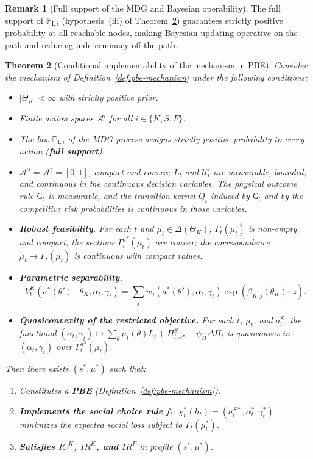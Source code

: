 \documentclass[ecta,nameyear,final,supplement]{econsocart}
\numberwithin{equation}{section}
\numberwithin{table}{section}
\newtheorem{theorem}{Theorem}[section]
\theoremstyle{definition}
\newtheorem{remark}[theorem]{Remark}
\newcommand{\ProbI}[1]{\mathbb{P}_{\mathrm{I},#1}}
\begin{document}
\begin{remark}[Full support of the MDG and Bayesian operability]
The full support of $\ProbI{i}$ (hypothesis~(iii) of
Theorem~\ref{thm:ebp-implementabilidad}) guarantees strictly positive
probability at all reachable nodes, making Bayesian updating operative on the
path and reducing indeterminacy off the path.
\end{remark}

\bigskip

\begin{theorem}[Conditional implementability of the mechanism in PBE]
\label{thm:ebp-implementabilidad}
Consider the mechanism of Definition~\ref{def:pbe-mechanism} under the
following conditions:
\begin{itemize}
  \item[\textup{(i)}] $|\Theta_K|<\infty$ with strictly positive prior.
  \item[\textup{(ii)}] Finite action spaces $\mathcal{A}^i$ for all
  $i\in\{K,S,F\}$.
  \item[\textup{(iii)}] The law $\ProbI{i}$ of the MDG process assigns strictly
  positive probability to every action (\textbf{full support}).
  \item[\textup{(iv)}] $\mathcal{A}^\alpha=\mathcal{A}^\gamma=[0,1]$,
  compact and convex; $L_t$ and $\mathcal{U}_t^i$ are measurable, bounded, and
  continuous in the continuous decision variables. The physical outcome rule
  $\mathsf{G}_t$ is measurable, and the transition kernel $Q_t$ induced by
  $\mathsf{G}_t$ and by the competitive risk probabilities is continuous in
  those variables.
  \item[\textup{(v)}] \textbf{Robust feasibility.}
  For each $t$ and $\mu_t\in\Delta(\Theta_K)$, $\Gamma_t(\mu_t)$ is non-empty
  and compact; the sections $\Gamma_t^{a^S}(\mu_t)$ are convex; the
  correspondence $\mu_t\mapsto\Gamma_t(\mu_t)$ is continuous with compact
  values.
  \item[\textup{(vi)}] \textbf{Parametric separability.}
  \[
  V^K_t(a^\ast(\theta')\mid\theta_K,\alpha_t,\gamma_t)
  =
  \sum_jw_j(a^\ast(\theta'),\alpha_t,\gamma_t)
  \exp(\beta_{K,j}(\theta_K)\cdot z).
  \]
  \item[\textup{(vii)}] \textbf{Quasiconvexity of the restricted objective.}
  For each $t$, $\mu_t$, and $a_t^S$, the functional
  $(\alpha_t,\gamma_t)\mapsto\sum_\theta\mu_t(\theta)L_t+\Pi^S_{t,a^S}
  -\psi_H\Delta H_t$ is quasiconvex in $(\alpha_t,\gamma_t)$ over
  $\Gamma_t^{a^S}(\mu_t)$.
\end{itemize}
Then there exists $(s^\ast,\mu^\ast)$ such that:
\begin{enumerate}
  \item[\textup{(a)}] Constitutes a \textbf{PBE}
  (Definition~\ref{def:pbe-mechanism}).
  \item[\textup{(b)}] \textbf{Implements the social choice rule} $f_t$:
  $\chi_t^\ast(h_t)=(a_t^{S\ast},\alpha_t^\ast,\gamma_t^\ast)$ minimizes the
  expected social loss subject to $\Gamma_t(\mu_t^\ast)$.
  \item[\textup{(c)}] \textbf{Satisfies $IC^K$, $IR^K$, and $IR^F$} in profile
  $(s^\ast,\mu^\ast)$.
\end{enumerate}
\end{theorem}
\end{document}
